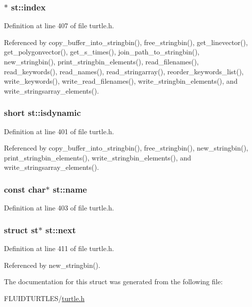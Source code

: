 \hypertarget{structst_aefccba712a02de708a1185876a342e3e}{
\subsubsection[{index}]{$\ast$ st\-::index}}\label{structst_aefccba712a02de708a1185876a342e3e}


Definition at line 407 of file turtle.\-h.



Referenced by copy\-\_\-buffer\-\_\-into\-\_\-stringbin(), free\-\_\-stringbin(), get\-\_\-linevector(), get\-\_\-polygonvector(), get\-\_\-s\-\_\-times(), join\-\_\-path\-\_\-to\-\_\-stringbin(), new\-\_\-stringbin(), print\-\_\-stringbin\-\_\-elements(), read\-\_\-filenames(), read\-\_\-keywords(), read\-\_\-names(), read\-\_\-stringarray(), reorder\-\_\-keywords\-\_\-list(), write\-\_\-keywords(), write\-\_\-read\-\_\-filenames(), write\-\_\-stringbin\-\_\-elements(), and write\-\_\-stringsarray\-\_\-elements().

\hypertarget{structst_afadfdd55b2e3b0f23568465d8d41ea8d}{
\subsubsection[{isdynamic}]{\setlength{\rightskip}{0pt plus 5cm}short st\-::isdynamic}}\label{structst_afadfdd55b2e3b0f23568465d8d41ea8d}


Definition at line 401 of file turtle.\-h.



Referenced by copy\-\_\-buffer\-\_\-into\-\_\-stringbin(), free\-\_\-stringbin(), new\-\_\-stringbin(), print\-\_\-stringbin\-\_\-elements(), write\-\_\-stringbin\-\_\-elements(), and write\-\_\-stringsarray\-\_\-elements().

\hypertarget{structst_ac0ecdbb00792dccee8cb6d6e6fd49227}{
\subsubsection[{name}]{\setlength{\rightskip}{0pt plus 5cm}const char$\ast$ st\-::name}}\label{structst_ac0ecdbb00792dccee8cb6d6e6fd49227}


Definition at line 403 of file turtle.\-h.

\hypertarget{structst_a901e9b8dd62788b381fc7e626ffda41e}{
\subsubsection[{next}]{\setlength{\rightskip}{0pt plus 5cm}struct {\bf st}$\ast$ st\-::next}}\label{structst_a901e9b8dd62788b381fc7e626ffda41e}


Definition at line 411 of file turtle.\-h.



Referenced by new\-\_\-stringbin().



The documentation for this struct was generated from the following file\-:\begin{DoxyCompactItemize}
\item 
F\-L\-U\-I\-D\-T\-U\-R\-T\-L\-E\-S/\hyperlink{turtle_8h}{turtle.\-h}\end{DoxyCompactItemize}
